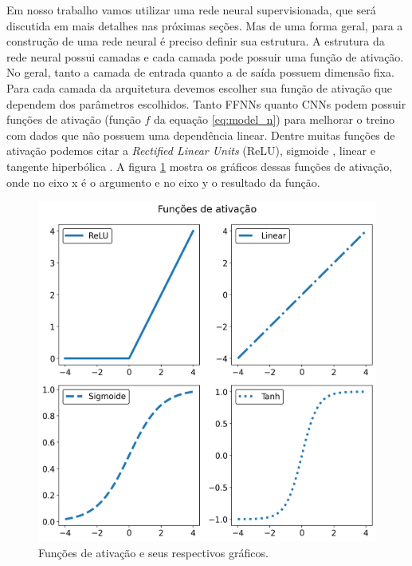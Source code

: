\documentclass[a4paper,12pt,oneside]{book}
\begin{document}
\par Em nosso trabalho vamos utilizar uma rede neural supervisionada, que será discutida em mais detalhes nas próximas seções. Mas de uma forma geral, para a construção de uma rede neural é preciso definir sua estrutura. A estrutura da rede neural possui camadas e cada camada pode possuir uma função de ativação. No geral, tanto a camada de entrada quanto a de saída possuem dimensão fixa. Para cada camada da arquitetura devemos escolher sua função de ativação que dependem dos parâmetros escolhidos. Tanto FFNNs quanto CNNs podem possuir funções de ativação (função $f$ da equação \ref{eq:model_n}) para melhorar o treino com dados que não possuem uma dependência linear. Dentre muitas funções de ativação podemos citar a \textit{Rectified Linear Units} (ReLU)\cite{RELU}, sigmoide \cite{sigmoid_act}, linear e tangente hiperbólica \cite{act_comp}. A figura \ref{fig:ativacoes} mostra os gráficos dessas funções de ativação, onde no eixo x é o argumento e no eixo y o resultado da função.
\begin{figure}[H]
    \centering
    \includegraphics[width=0.8\columnwidth]{figs/ativacoes.png}
    \caption{Funções de ativação e seus respectivos gráficos.}
    \label{fig:ativacoes}
\end{figure}
\end{document}
